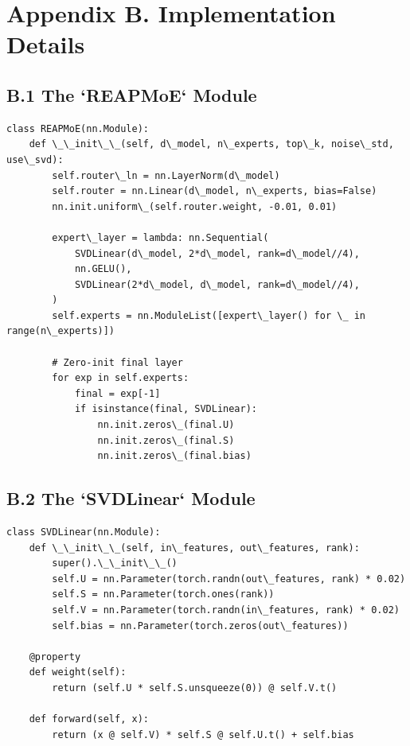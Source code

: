 \section{Appendix B. Implementation Details}

\subsection{B.1 The `REAPMoE` Module}

\begin{lstlisting}
class REAPMoE(nn.Module):
    def \_\_init\_\_(self, d\_model, n\_experts, top\_k, noise\_std, use\_svd):
        self.router\_ln = nn.LayerNorm(d\_model)
        self.router = nn.Linear(d\_model, n\_experts, bias=False)
        nn.init.uniform\_(self.router.weight, -0.01, 0.01)
        
        expert\_layer = lambda: nn.Sequential(
            SVDLinear(d\_model, 2*d\_model, rank=d\_model//4),
            nn.GELU(),
            SVDLinear(2*d\_model, d\_model, rank=d\_model//4),
        )
        self.experts = nn.ModuleList([expert\_layer() for \_ in range(n\_experts)])
        
        # Zero-init final layer
        for exp in self.experts:
            final = exp[-1]
            if isinstance(final, SVDLinear):
                nn.init.zeros\_(final.U)
                nn.init.zeros\_(final.S)
                nn.init.zeros\_(final.bias)
\end{lstlisting}

\subsection{B.2 The `SVDLinear` Module}

\begin{lstlisting}
class SVDLinear(nn.Module):
    def \_\_init\_\_(self, in\_features, out\_features, rank):
        super().\_\_init\_\_()
        self.U = nn.Parameter(torch.randn(out\_features, rank) * 0.02)
        self.S = nn.Parameter(torch.ones(rank))
        self.V = nn.Parameter(torch.randn(in\_features, rank) * 0.02)
        self.bias = nn.Parameter(torch.zeros(out\_features))
    
    @property
    def weight(self):
        return (self.U * self.S.unsqueeze(0)) @ self.V.t()
    
    def forward(self, x):
        return (x @ self.V) * self.S @ self.U.t() + self.bias
\end{lstlisting}

